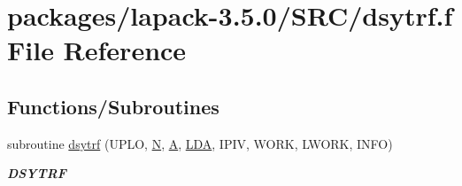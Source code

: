 \hypertarget{dsytrf_8f}{}\section{packages/lapack-\/3.5.0/\+S\+R\+C/dsytrf.f File Reference}
\label{dsytrf_8f}
\subsection*{Functions/\+Subroutines}
\begin{DoxyCompactItemize}
\item 
subroutine \hyperlink{group__doubleSYcomputational_gad91bde1212277b3e909eb6af7f64858a}{dsytrf} (U\+P\+L\+O, \hyperlink{polmisc_8c_a0240ac851181b84ac374872dc5434ee4}{N}, \hyperlink{classA}{A}, \hyperlink{example__user_8c_ae946da542ce0db94dced19b2ecefd1aa}{L\+D\+A}, I\+P\+I\+V, W\+O\+R\+K, L\+W\+O\+R\+K, I\+N\+F\+O)
\begin{DoxyCompactList}\small\item\em {\bfseries D\+S\+Y\+T\+R\+F} \end{DoxyCompactList}\end{DoxyCompactItemize}
